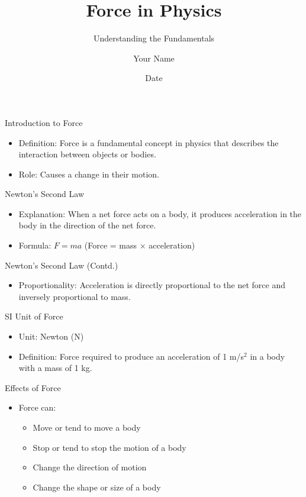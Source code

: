 \documentclass{beamer}
\begin{document}
\title{Force in Physics}
\subtitle{Understanding the Fundamentals}
\author{Your Name}
\date{Date}

\begin{frame}
\titlepage
\end{frame}

\begin{frame}{Introduction to Force}
\begin{itemize}
\item Definition: Force is a fundamental concept in physics that describes the interaction between objects or bodies.
\item Role: Causes a change in their motion.
\end{itemize}
\end{frame}

\begin{frame}{Newton's Second Law}
\begin{itemize}
\item Explanation: When a net force acts on a body, it produces acceleration in the body in the direction of the net force.
\item Formula: $F = ma$ (Force = mass $\times$ acceleration)
\end{itemize}
\end{frame}

\begin{frame}{Newton's Second Law (Contd.)}
\begin{itemize}
\item Proportionality: Acceleration is directly proportional to the net force and inversely proportional to mass.
\end{itemize}
\end{frame}

\begin{frame}{SI Unit of Force}
\begin{itemize}
\item Unit: Newton (N)
\item Definition: Force required to produce an acceleration of 1 m/s$^2$ in a body with a mass of 1 kg.
\end{itemize}
\end{frame}

\begin{frame}{Effects of Force}
\begin{itemize}
\item Force can:
  \begin{itemize}
  \item Move or tend to move a body
  \item Stop or tend to stop the motion of a body
  \item Change the direction of motion
  \item Change the shape or size of a body
  \end{itemize}
\end{itemize}
\end{frame}
\end{document}
